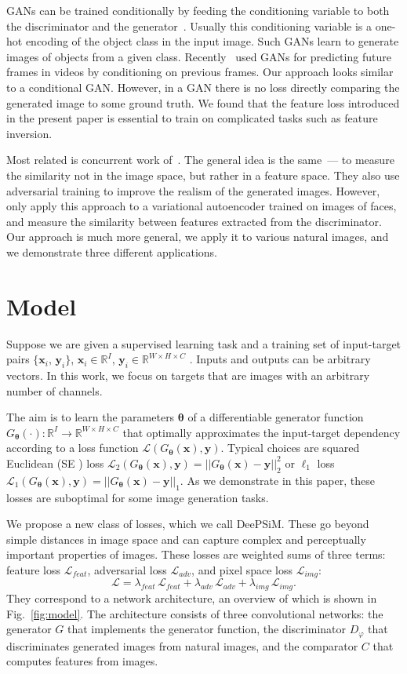 \documentclass{article}
\newcommand{\oR}{\mathbb{R}}
\newcommand{\inp}{\mathbf{x}}
\newcommand{\targ}{\mathbf{y}}
\newcommand{\weights}{\mathbf{\theta}}
\newcommand{\gen}{G_\weights}
\newcommand{\discr}{D_\varphi}
\newcommand{\loss}{\mathcal{L}}
\newcommand{\ltwo}{SE }
\newcommand{\lone}{$\ell_1$ }
\newcommand{\featloss}{\loss_{feat}}
\newcommand{\discrloss}{\loss_{adv}}
\newcommand{\pixloss}{\loss_{img}}
\newcommand{\imgspace}{\oR^{W \times H \times C}}
\newcommand{\inspace}{\oR^I}
\begin{document}
GANs can be trained conditionally by feeding the conditioning variable to both the discriminator and the generator~\citep{Mirza_2014}.
Usually this conditioning variable is a one-hot encoding of the object class in the input image.
Such GANs learn to generate images of objects from a given class.
Recently~\citet{Mathieu_arxiv2015} used GANs for predicting future frames in videos by conditioning on previous frames.
Our approach looks similar to a conditional GAN. 
However, in a GAN there is no loss directly comparing the generated image to some ground truth.
We found that the feature loss introduced in the present paper is essential to train on complicated tasks such as feature inversion.

Most related is concurrent work of~\citet{Larsen_arxiv2015}.
The general idea is the same~--- to measure the similarity not in the image space, but rather in a feature space.
They also use adversarial training to improve the realism of the generated images.
However, \citet{Larsen_arxiv2015} only apply this approach to a variational autoencoder trained on images of faces, and measure the similarity between features extracted from the discriminator.
Our approach is much more general, we apply it to various natural images, and we demonstrate three different applications. 


\section{Model}
Suppose we are given a supervised learning task and a training set of input-target pairs $\{\inp_i,\, \targ_i\}$, $\inp_i \in \inspace$, $\targ_i \in \imgspace$ .
Inputs and outputs can be arbitrary vectors. In this work, we focus on targets that are images with an arbitrary number of channels. 

The aim is to learn the parameters $\weights$ of a differentiable generator function $\gen(\cdot) \colon \inspace \to \imgspace$ that optimally approximates the input-target dependency according to a loss function $\loss (\gen(\inp), \targ)$.
Typical choices are squared Euclidean (\ltwo\!\!) loss $\loss_2 (\gen(\inp), \targ) = || \gen(\inp) - \targ ||_2^2$ or \lone loss $\loss_1 (\gen(\inp),\targ) = ||\gen(\inp)-\targ||_1$.
As we demonstrate in this paper, these losses are suboptimal for some image generation tasks. 

We propose a new class of losses, which we call DeePSiM.
These go beyond simple distances in image space and can capture complex and perceptually important properties of images.
These losses are weighted sums of three terms: feature loss $\featloss$, adversarial loss $\discrloss$, and pixel space loss $\pixloss$:
\begin{equation}
 \loss = \lambda_{feat}\, \featloss  + \lambda_{adv}\, \discrloss + \lambda_{img}\, \pixloss.
\end{equation}
They correspond to a network architecture, an overview of which is shown in Fig.~\ref{fig:model}. The architecture consists of three convolutional networks: the generator $G$ that implements the generator function, the discriminator $\discr$ that discriminates generated images from natural images, and the comparator $C$ that computes features from images.     
\end{document}
